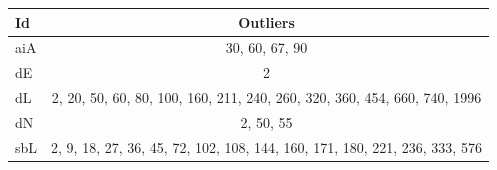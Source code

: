 \begin{tabular}{lc}
\toprule
Id & Outliers \\
\midrule
aiA & 30, 60, 67, 90 \\
dE & 2 \\
dL & 2, 20, 50, 60, 80, 100, 160, 211, 240, 260, 320, 360, 454, 660, 740, 1996 \\
dN & 2, 50, 55 \\
sbL & 2, 9, 18, 27, 36, 45, 72, 102, 108, 144, 160, 171, 180, 221, 236, 333, 576 \\
\bottomrule
\end{tabular}
